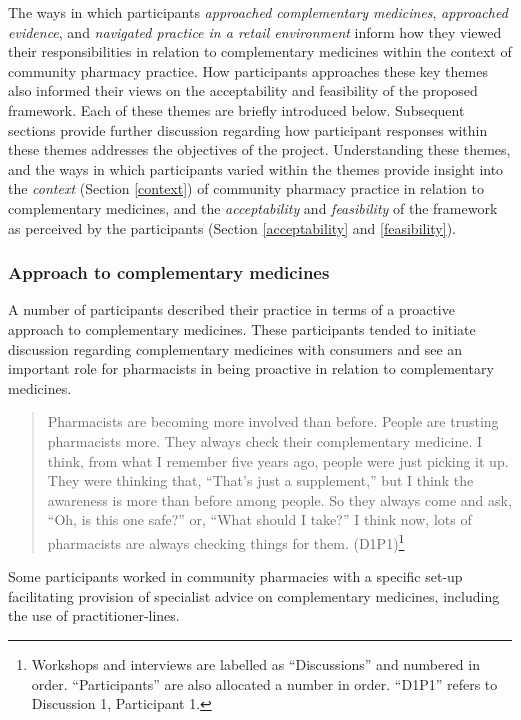 \documentclass[12pt,]{article}
\begin{document}


The ways in which participants \emph{approached complementary
medicines}, \emph{approached evidence}, and \emph{navigated practice in
a retail environment} inform how they viewed their responsibilities in
relation to complementary medicines within the context of community
pharmacy practice. How participants approaches these key themes also
informed their views on the acceptability and feasibility of the
proposed framework. Each of these themes are briefly introduced below.
Subsequent sections provide further discussion regarding how participant
responses within these themes addresses the objectives of the project.
Understanding these themes, and the ways in which participants varied
within the themes provide insight into the \emph{context} (Section
\ref{context}) of community pharmacy practice in relation to
complementary medicines, and the \emph{acceptability} and
\emph{feasibility} of the framework as perceived by the participants
(Section \ref{acceptability} and \ref{feasibility}).

\subsubsection{Approach to complementary
medicines}\label{approach-to-complementary-medicines}

A number of participants described their practice in terms of a
proactive approach to complementary medicines. These participants tended
to initiate discussion regarding complementary medicines with consumers
and see an important role for pharmacists in being proactive in relation
to complementary medicines.

\begin{quote}
Pharmacists are becoming more involved than before. People are trusting
pharmacists more. They always check their complementary medicine. I
think, from what I remember five years ago, people were just picking it
up. They were thinking that, ``That's just a supplement,'' but I think
the awareness is more than before among people. So they always come and
ask, ``Oh, is this one safe?'' or, ``What should I take?'' I think now,
lots of pharmacists are always checking things for them.
(D1P1)\footnote{Workshops and interviews are labelled as ``Discussions''
  and numbered in order. ``Participants'' are also allocated a number in
  order. ``D1P1'' refers to Discussion 1, Participant 1.}
\end{quote}

Some participants worked in community pharmacies with a specific set-up
facilitating provision of specialist advice on complementary medicines,
including the use of practitioner-lines.
\end{document}
